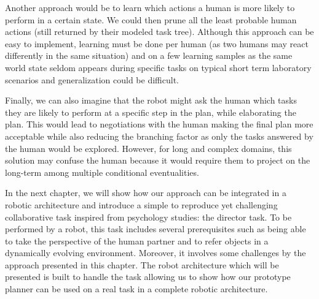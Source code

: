\documentclass[a4paper,11pt,twoside]{StyleThese}
\begin{document}
Another approach would be to learn which actions a human is more likely to perform in a certain state. We could then prune all the least probable human actions (still returned by their modeled task tree). Although this approach can be easy to implement, learning must be done per human (as two humans may react differently in the same situation) and on a few learning samples as the same world state seldom appears during specific tasks on typical short term laboratory scenarios and generalization could be difficult.

Finally, we can also imagine that the robot might ask the human which tasks they are likely to perform at a specific step in the plan, while elaborating the plan. This would lead to negotiations with the human making the final plan more acceptable while also reducing the branching factor as only the tasks answered by the human would be explored. However, for long and complex domains, this solution may confuse the human because it would require them to project on the long-term among multiple conditional eventualities.

In the next chapter, we will show how our approach can be integrated in a robotic architecture and introduce a simple to reproduce yet challenging collaborative task inspired from psychology studies: the director task. To be performed by a robot, this task includes several prerequisites such as being able to take the perspective of the human partner and to refer objects in a dynamically evolving environment. Moreover, it involves some challenges by the approach presented in this chapter. The robot architecture which will be presented is built to handle the task allowing us to show how our prototype planner can be used on a real task in a complete robotic architecture.

\ifdefined{}
\else


\end{document}
